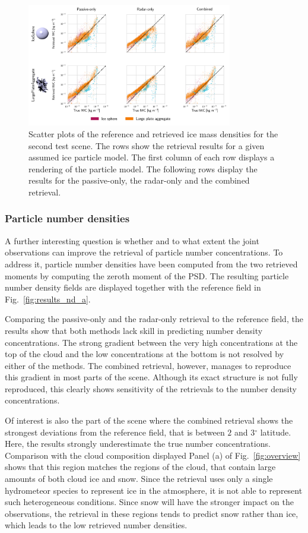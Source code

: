 \documentclass[journal abbreviation, manuscript]{copernicus}
\begin{document}
\begin{figure}
\centering
\includegraphics[width = 0.8\textwidth]{../plots/results_scatter_b_1}
\caption{Scatter plots of the reference and retrieved ice mass densities for
  the second test scene. The rows show the retrieval results for a given
  assumed ice particle model. The first column of each row displays a rendering
  of the particle model. The following rows display the results for the
  passive-only, the radar-only and the combined retrieval.}
\label{fig:results_scatter_b_1}
\end{figure}


\subsubsection{Particle number densities}

A further interesting question is whether and to what extent the joint
observations can improve the retrieval of particle number concentrations.
To address it, particle number densities have been computed from the two
retrieved moments by computing the zeroth moment of the PSD. The resulting
particle number density fields are displayed together with the reference
field in Fig.~\ref{fig:results_nd_a}.

Comparing the passive-only and the radar-only retrieval to the reference
field, the results show that both methods lack skill in predicting number
density concentrations. The strong gradient between the very high concentrations
at the top of the cloud and the low concentrations at the bottom is not resolved
by either of the methods. The combined retrieval, however, manages to reproduce
this gradient in most parts of the scene. Although its exact structure
is not fully reproduced, this clearly shows sensitivity of the retrievals to
the number density concentrations.

Of interest is also the part of the scene where the combined retrieval shows
the strongest deviations from the reference field, that is between $2$ and
$3\unit{^\circ}$ latitude. Here, the results strongly underestimate the true
number concentrations. Comparison with the cloud composition displayed Panel (a)
of Fig.~\ref{fig:overview} shows that this region matches the regions of the
cloud, that contain large amounts of both cloud ice and snow. Since the
retrieval uses only a single hydrometeor species to represent ice in the
atmosphere, it is not able to represent such heterogeneous conditions. Since
snow will have the stronger impact on the observations, the retrieval in these
regions tends to predict snow rather than ice, which leads to the low retrieved
number densities.
\end{document}
